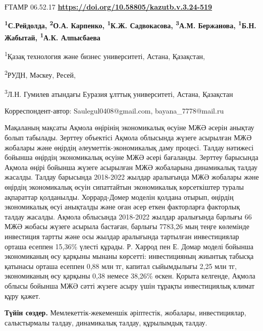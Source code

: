 \newpage
ҒТАМР 06.52.17
\hfill {\bfseries \href{https://doi.org/10.58805/kazutb.v.3.24-519}{https://doi.org/10.58805/kazutb.v.3.24-519}}


\begin{center}
{\bfseries \textsuperscript{1}С.Рейдолда\envelope, \textsuperscript{2}О.А. Карпенко, \textsuperscript{1}К.Ж. Садвокасова, \textsuperscript{3}А.М. Бержанова, \textsuperscript{1}Б.Н. Жабытай\envelope, \textsuperscript{1}А.К. Алпысбаева}

\textsuperscript{1}Қазақ технология және бизнес университеті, Астана,
Қазақстан,

\textsuperscript{2}РУДН, Мәскеу, Ресей,

\textsuperscript{3}Л.Н. Гумилев атындағы Еуразия ұлттық университеті,
Астана, Қазақстан
\end{center}
\envelope Корреспондент-автор: Saulegul0408@gmail.com, bayana\_7778@mail.ru

Мақаланың мақсаты Ақмола өңірінің экономикалық өсуіне МЖӘ әсерін анықтау
болып табылады. Зерттеу объектісі Ақмола облысында жүзеге асырылған МЖӘ
жобалары және өңірдің әлеуметтік-экономикалық даму процесі. Талдау
нәтижесі бойынша өңірдің экономикалық өсуіне МЖӘ әсері бағаланды.
Зерттеу барысында Ақмола өңірі бойынша жүзеге асырылған МЖӘ жобаларына
динамикалық талдау жасалды. Талдау барысында 2018-2022 жылдар аралығында
МЖӘ жобалары және өңірдің экономикалық өсуін сипаттайтын экономикалық
көрсеткіштер туралы ақпараттар қолданылды. Хоррард-Домер моделін қолдана
отырып, өңірдің экономикалық өсуі анықталды және оған әсер еткен
факторларға факторлық талдау жасалды. Ақмола облысында 2018-2022 жылдар
аралығында барлығы 66 МЖӘ жобасы жүзеге асырыла бастаған, барлығы
7783,26 мың теңге көлемінде инвестиция тартты және осы жылдар аралығында
тартылған инвестициялар орташа есеппен 15,36\% үлесті құрады. Р. Харрод
пен Е. Домар моделі бойынша экономиканың өсу қарқыны мынаны көрсетті:
инвестицияның жиынтық табысқа қатынасы орташа есеппен 0,88 млн тг,
капитал сыйымдылығы 2,25 млн тг, экономиканың өсу қарқыны 0,38 немесе
38,26\% өскен. Қорыта келгенде, Ақмола облысы бойынша МЖӘ сәтті жүзеге
асыру үшін тұрақты инвестициялық климат құру қажет.

{\bfseries Түйін сөздер.} Мемлекеттік-жекеменшік әріптестік, жобалары,
инвестициялар, салыстырмалы талдау, динамикалық талдау, құрылымдық
талдау.

